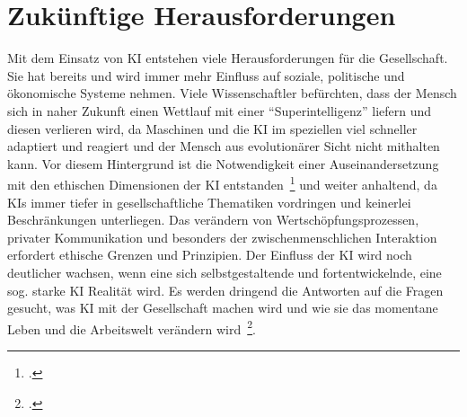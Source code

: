 \newpage
\section{Zukünftige Herausforderungen}\label{Herausforderungen}

Mit dem Einsatz von \ac{KI} entstehen viele Herausforderungen für die Gesellschaft. Sie hat bereits und wird immer mehr Einfluss auf soziale, politische und ökonomische Systeme nehmen.
Viele Wissenschaftler befürchten, dass der Mensch sich in naher Zukunft einen Wettlauf mit einer \enquote{Superintelligenz} liefern und diesen verlieren wird,
da Maschinen und die \ac{KI} im speziellen viel schneller adaptiert und reagiert und der Mensch aus evolutionärer Sicht nicht mithalten kann. Vor diesem Hintergrund ist die
Notwendigkeit einer Auseinandersetzung mit den ethischen Dimensionen der \ac{KI} entstanden~\footcite[\vglf][]{Wittpahl.2018} und weiter anhaltend, da \ac{KI}s
immer tiefer in gesellschaftliche Thematiken vordringen und keinerlei Beschränkungen unterliegen. Das verändern von Wertschöpfungsprozessen, privater Kommunikation und 
besonders der zwischenmenschlichen Interaktion erfordert ethische Grenzen und Prinzipien. Der Einfluss der \ac{KI} wird noch deutlicher wachsen, 
wenn eine sich selbstgestaltende und fortentwickelnde, eine sog. starke \ac{KI} Realität wird. Es werden dringend die Antworten auf die Fragen gesucht, was \ac{KI} mit
der Gesellschaft machen wird und wie sie das momentane Leben und die Arbeitswelt verändern wird~\footcite[\vglf][]{Wittpahl.2018}.

